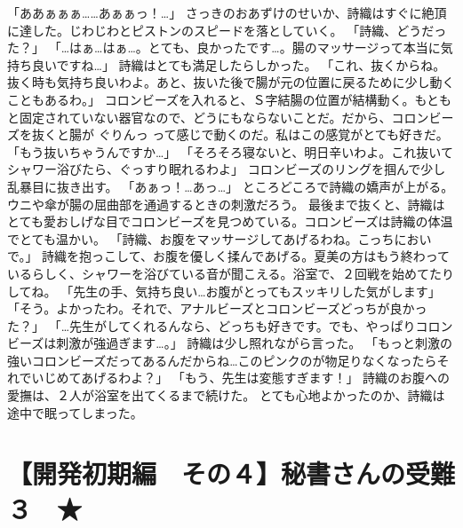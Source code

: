 「ああぁぁぁ……あぁぁっ！…」
さっきのおあずけのせいか、詩織はすぐに絶頂に達した。じわじわとピストンのスピードを落としていく。
「詩織、どうだった？」
「…はぁ…はぁ…。とても、良かったです…。腸のマッサージって本当に気持ち良いですね…」
詩織はとても満足したらしかった。
「これ、抜くからね。抜く時も気持ち良いわよ。あと、抜いた後で腸が元の位置に戻るために少し動くこともあるわ。」
コロンビーズを入れると、Ｓ字結腸の位置が結構動く。もともと固定されていない器官なので、どうにもならないことだ。だから、コロンビーズを抜くと腸が ぐりんっ って感じで動くのだ。私はこの感覚がとても好きだ。
「もう抜いちゃうんですか…」
「そろそろ寝ないと、明日辛いわよ。これ抜いてシャワー浴びたら、ぐっすり眠れるわよ」
コロンビーズのリングを掴んで少し乱暴目に抜き出す。
「あぁっ！…あっ…」
ところどころで詩織の嬌声が上がる。ウニや傘が腸の屈曲部を通過するときの刺激だろう。
最後まで抜くと、詩織はとても愛おしげな目でコロンビーズを見つめている。コロンビーズは詩織の体温でとても温かい。
「詩織、お腹をマッサージしてあげるわね。こっちにおいで。」
詩織を抱っこして、お腹を優しく揉んであげる。夏美の方はもう終わっているらしく、シャワーを浴びている音が聞こえる。浴室で、２回戦を始めてたりしてね。
「先生の手、気持ち良い…お腹がとってもスッキリした気がします」
「そう。よかったわ。それで、アナルビーズとコロンビーズどっちが良かった？」
「…先生がしてくれるんなら、どっちも好きです。でも、やっぱりコロンビーズは刺激が強過ぎます…。」
詩織は少し照れながら言った。
「もっと刺激の強いコロンビーズだってあるんだからね…このピンクのが物足りなくなったらそれでいじめてあげるわよ？」
「もう、先生は変態すぎます！」
詩織のお腹への愛撫は、２人が浴室を出てくるまで続けた。
とても心地よかったのか、詩織は途中で眠ってしまった。



\section{【開発初期編　その４】秘書さんの受難３　★}

